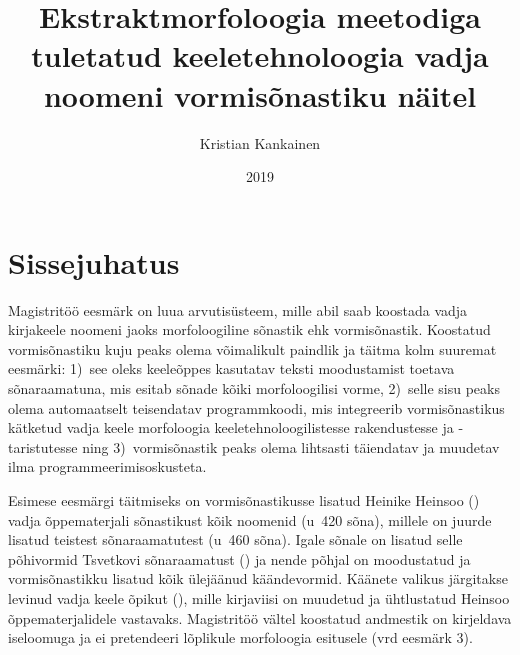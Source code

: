 \documentclass[12pt,a4paper]{article}
\begin{document}
\title{Ekstraktmorfoloogia meetodiga tuletatud keeletehnoloogia vadja noomeni vormisõnastiku näitel}
\author{Kristian Kankainen}
\date{2019}
\maketitle


\newpage
\tableofcontents




\newpage
{}
\section{Sissejuhatus}
\label{sissejuhatus}


Magistritöö eesmärk on luua arvuti\-süsteem, mille abil saab koostada vadja kirja\-keele noomeni jaoks morfoloogiline sõnastik ehk vormisõnastik. Koostatud vormisõnastiku kuju peaks olema võimalikult paindlik ja täitma kolm suuremat eesmärki: 1)~see oleks keeleõppes kasutatav teksti moodustamist toetava sõnaraamatuna, mis esitab sõnade kõiki morfoloogilisi vorme, 2)~selle sisu peaks olema automaatselt teisendatav programm\-koodi,
mis integreerib vormisõnastikus kätketud vadja keele morfoloogia keele\-tehnoloogilistesse rakendustesse ja -taristutesse ning 3)~vormisõnastik peaks olema lihtsasti täiendatav ja muudetav ilma programmeerimis\-oskusteta.

Esimese eesmärgi täitmiseks on vormi\-sõnastikusse lisatud Heinike Heinsoo (\citeyear{heinsoo_vadsonakopittoja_2015}) vadja õppematerjali sõnastikust kõik noomenid (u~420 sõna), millele on juurde lisatud teistest sõnaraamatutest (u~460 sõna). Igale sõnale on lisatud selle põhivormid Tsvetkovi sõnaraamatust (\cite{laakso_vatjan_1989}) ja nende põhjal on moodustatud ja vormi\-sõnastikku lisatud kõik ülejäänud käändevormid. Käänete valikus järgitakse levinud vadja keele õpikut (\cite{konkova_vaddceeli_2014}), mille kirja\-viisi on muudetud ja ühtlustatud Heinsoo õppematerjalidele vastavaks. Magistritöö vältel koostatud andmestik on kirjeldava iseloomuga ja ei pretendeeri lõplikule morfoloogia esitusele (vrd eesmärk 3).
\end{document}
